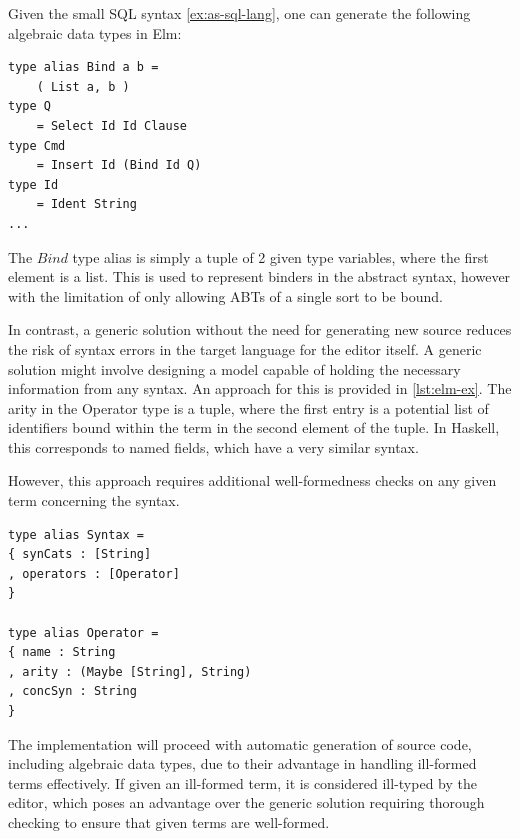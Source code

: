 \documentclass[sigplan,review]{acmart}
\begin{document}
\begin{example}\label{ex:sql-data-types}
  Given the small SQL syntax \cref{ex:as-sql-lang}, one can generate the following algebraic data types in Elm:
  \begin{lstlisting}[style=examplestyle]
type alias Bind a b =
    ( List a, b )
type Q
    = Select Id Id Clause
type Cmd
    = Insert Id (Bind Id Q)
type Id
    = Ident String
...
\end{lstlisting}

  The $Bind$ type alias is simply a tuple of 2 given type variables,
  where the first element is a list. This is used to represent binders in the
  abstract syntax, however with the limitation of only allowing ABTs of a single
  sort to be bound.
\end{example}

In contrast, a generic solution without the need for generating new source reduces the risk of syntax errors in the target language for the editor itself. A generic solution might involve designing a model capable of holding the necessary information from any syntax. An approach for this is provided in \cref{lst:elm-ex}.
The arity in the Operator type is a tuple, where the first entry is a potential
list of identifiers bound within the term in the second element of the tuple.
In Haskell, this corresponds to named fields\cite{haskell-records-named-fields},
which have a very similar syntax.

However, this approach requires additional well-formedness checks on any given term concerning the syntax.

\begin{minipage}{\linewidth}
  \begin{lstlisting}[style=inline,caption={Elm Records for storing syntax information},label={lst:elm-ex}]
type alias Syntax =
{ synCats : [String]
, operators : [Operator]
}

type alias Operator =
{ name : String
, arity : (Maybe [String], String)
, concSyn : String
}
\end{lstlisting}
\end{minipage}

The implementation will proceed with automatic generation of source code,
including algebraic data types, due to their advantage in handling ill-formed
terms effectively. If given an ill-formed term, it is considered ill-typed by
the editor, which poses an advantage over the generic solution requiring
thorough checking to ensure that given terms are well-formed.
\end{document}
